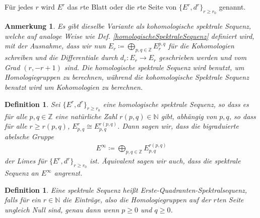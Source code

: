 \documentclass[12pt, hidelinks]{article}
\numberwithin{conj}{section}
\newtheorem{definition}[conj]{Definition}
\newtheorem{remark}[conj]{Anmerkung}
\newcommand{\Z}{\mathbb{Z}}
\begin{document}
Für jedes $r$ wird $E^r$ das $r$te Blatt oder die $r$te Seite von $\{E^r,d^r\}_{r \geq r_0}$ genannt.

\begin{remark}
    Es gibt dieselbe Variante als kohomologische spektrale Sequenz, welche auf analoge Weise wie Def. \ref{homologischeSpektraleSequenz} definiert wird, mit der Ausnahme, dass wir nun $E_r \coloneq \bigoplus_{p,q \in \Z} E^{p,q}_r$ für die Kohomologien schreiben und die Differentiale durch $d_r: E_r \to E_r$ geschrieben werden und vom Grad $(r,-r+1)$ sind. Die homologische spektrale Sequenz wird benutzt, um Homologiegruppen zu berechnen, während die kohomologische Spektrale Sequenz benutzt wird um Kohomologien zu berechnen.
\end{remark}

\begin{definition}
    Sei $\{E^r, d^r\}_{r \geq r_0}$ eine homologische spektrale Sequenz, so dass es für alle $p,q \in \Z$ eine natürliche Zahl $r(p,q) \in \mathbb{N}$ gibt, abhängig von $p,q$, so dass für alle $r \geq r(p,q)$, $E^r_{p,q} \cong E_{p,q}^{r(p,q)}$. Dann sagen wir, dass die bigraduierte abelsche Gruppe
    \begin{align}
        E^\infty \coloneq \bigoplus_{p,q \in \Z} E^{r(p,q)}_{p,q}
    \end{align}
    der Limes für $\{E^r, d^r\}_{r \geq r_0}$ ist. Äquivalent sagen wir auch, dass die spektrale Sequenz an $E^\infty$ angrenzt.
\end{definition}

\begin{definition}
    Eine spektrale Sequenz heißt Erste-Quadranten-Spektralsequenz, falls für ein $r \in \mathbb{N}$ die Einträge, also die Homologiegruppen auf der $r$ten Seite ungleich Null sind, genau dann wenn $p \geq 0$ und $q \geq 0$.
\end{definition}
\end{document}

